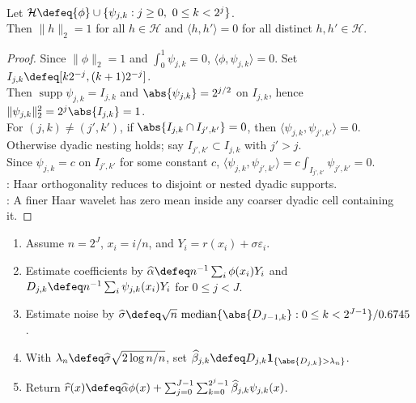 \begin{proposition} \label{prop:haar-wavelets-orthonormal-direct-check} \\
Let $\mathcal{H}\defeq\{\phi\}\cup\{\psi_{j,k}:j\geq0,\ 0\leq k<2^j\}$.\\
Then $\|h\|_2=1$ for all $h\in\mathcal{H}$ and $\langle h,h'\rangle=0$ for all distinct $h,h'\in\mathcal{H}$.
\begin{proof} Since $\|\phi\|_2=1$ and $\int_0^1\psi_{j,k}=0$, $\langle\phi,\psi_{j,k}\rangle=0$. Set $I_{j,k}\defeq[k2^{-j},(k+1)2^{-j}]$.\\
Then $\operatorname{supp}\psi_{j,k}=I_{j,k}$ and $\abs{\psi_{j,k}}=2^{j/2}$ on $I_{j,k}$, hence $\|\psi_{j,k}\|_2^2=2^j\abs{I_{j,k}}=1$.\\
For $(j,k)\neq(j',k')$, if $\abs{I_{j,k}\cap I_{j',k'}}=0$, then $\langle\psi_{j,k},\psi_{j',k'}\rangle=0$.\\
Otherwise dyadic nesting holds; say $I_{j',k'}\subset I_{j,k}$ with $j'>j$.\\
Since $\psi_{j,k}=c$ on $I_{j',k'}$ for some constant $c$, $\langle\psi_{j,k},\psi_{j',k'}\rangle=c\int_{I_{j',k'}}\psi_{j',k'}=0$.\\
: Haar orthogonality reduces to disjoint or nested dyadic supports.\\
: A finer Haar wavelet has zero mean inside any coarser dyadic cell containing it.
\end{proof}
\end{proposition}

\begin{method} \label{meth:haar-wavelet-regression-thresholding} 
\begin{enumerate}[label=(\roman*)]
\setlength{\itemsep}{0pt}
\item Assume $n=2^J$, $x_i=i/n$, and $Y_i=r(x_i)+\sigma\varepsilon_i$.
\item Estimate coefficients by $\widehat\alpha\defeq n^{-1}\sum_i\phi(x_i)Y_i$ and $D_{j,k}\defeq n^{-1}\sum_i\psi_{j,k}(x_i)Y_i$ for $0\leq j<J$.
\item Estimate noise by $\widehat\sigma\defeq\sqrt n\,\operatorname{median}\{\abs{D_{J-1,k}}:0\leq k<2^{J-1}\}/0.6745$.
\item With $\lambda_n\defeq\widehat\sigma\sqrt{2\log n/n}$, set $\widehat\beta_{j,k}\defeq D_{j,k}\mathbf{1}_{\{\abs{D_{j,k}}>\lambda_n\}}$.
\item Return $\widehat r(x)\defeq\widehat\alpha\phi(x)+\sum_{j=0}^{J-1}\sum_{k=0}^{2^j-1}\widehat\beta_{j,k}\psi_{j,k}(x)$.
\end{enumerate}
\end{method}


